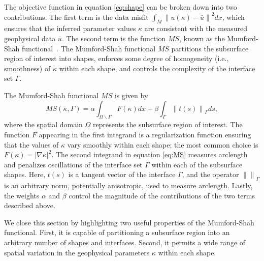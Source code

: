 \documentclass[manuscript,revised]{geophysics}
\newcommand\norm[1]{\left\lVert#1\right\rVert}
\begin{document}
The objective function in equation \ref{eq:shape} can be broken down into two contributions.  The first term is the data misfit  $\int_M \norm{u(\kappa)-\bar{u}}^2  dx$, which ensures that the inferred parameter values $\kappa$ are consistent with the measured geophysical data $\bar{u}$.  The second term is the function $MS$, known as the Mumford-Shah functional~\cite[]{Mumford_1989}. The Mumford-Shah functional $MS$ partitions the subsurface region of interest into shapes, enforces some degree of homogeneity (i.e., smoothness) of $\kappa$ within each shape, and controls the complexity of the interface set $\Gamma$. 

The Mumford-Shah functional $MS$ is given by
\begin{equation} \label{eq:MS}
MS(\kappa,\Gamma)=\alpha \int_{\Omega\backslash\Gamma} F(\kappa) dx + \beta\int_\Gamma \norm{t(s)}_\Gamma  ds ,
\end{equation}
where the spatial domain $\Omega$ represents the subsurface region of interest.  The function $F$ appearing in the first integrand is a regularization function ensuring that the values of $\kappa$ vary smoothly within each shape; the most common choice is $F(\kappa)=\left\vert \nabla \kappa \right\vert^2$.   The second integrand in equation \ref{eq:MS} measures arclength and penalizes oscillations of the interface set $\Gamma$ within each of the subsurface shapes.  Here, $t(s)$ is a tangent vector of the interface $\Gamma$, and the operator $\norm{}_\Gamma$ is an arbitrary norm, potentially anisotropic, used to measure arclength.  Lastly, the weights $\alpha$ and $\beta$ control the magnitude of the contributions of the two terms described above.  


We close this section by highlighting two useful properties of the Mumford-Shah functional.  First, it is capable of partitioning a subsurface region into an arbitrary number of shapes and interfaces. Second, it permits a wide range of spatial variation in the geophysical parameters $\kappa$ within each shape.
\end{document}
